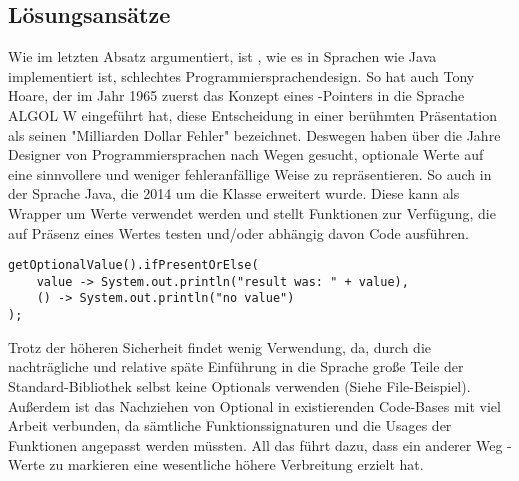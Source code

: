\subsection{Lösungsansätze}
Wie im letzten Absatz argumentiert, ist , wie es in Sprachen wie Java implementiert ist, schlechtes
Programmiersprachendesign.
So hat auch Tony Hoare, der im Jahr 1965 zuerst das Konzept eines -Pointers in die Sprache ALGOL W
eingeführt hat, diese Entscheidung in einer berühmten Präsentation als seinen "Milliarden Dollar Fehler" bezeichnet.\cite{infoqNullRefs}
Deswegen haben über die Jahre Designer von Programmiersprachen nach Wegen gesucht, optionale Werte auf eine sinnvollere
und weniger fehleranfällige Weise zu repräsentieren.
So auch in der Sprache Java, die 2014 um die  Klasse erweitert wurde.\cite{jdocOptional}
Diese kann als Wrapper um Werte verwendet werden und stellt Funktionen zur Verfügung, die auf Präsenz eines Wertes
testen und/oder abhängig davon Code ausführen.

\begin{verbatim}
getOptionalValue().ifPresentOrElse(
    value -> System.out.println("result was: " + value),
    () -> System.out.println("no value")
);
\end{verbatim}

Trotz der höheren Sicherheit findet  wenig Verwendung, da, durch die nachträgliche und relative
späte Einführung in die Sprache große Teile der Standard-Bibliothek selbst keine Optionals verwenden (Siehe
File-Beispiel).
Außerdem ist das Nachziehen von Optional in existierenden Code-Bases mit viel Arbeit verbunden, da sämtliche
Funktionssignaturen und die Usages der Funktionen angepasst werden müssten.
All das führt dazu, dass ein anderer Weg -Werte zu markieren eine wesentliche höhere Verbreitung
erzielt hat.

